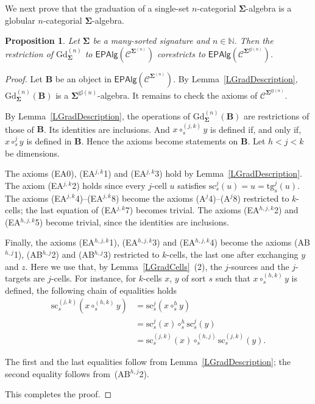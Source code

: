 \documentclass[a4paper, reqno
]{amsart}
\newcommand{\sig}[1]{\mathbf{#1}}             %
\newcommand{\spec}[1]{\boldsymbol{\mathcal{#1}}} %
\newcommand{\gl}{\mathrm{gl}}                %
\newcommand{\src}{\mathrm{sc}}
\newcommand{\tgt}{\mathrm{tg}}
\newcommand{\Gd}{\mathrm{Gd}}
\theoremstyle{plain}
\newtheorem{proposition}[theorem]{Proposition}
\theoremstyle{definition}
\begin{document}
We next prove that the graduation of a single-set $n$-categorial $\sig{\Sigma}$-algebra is a globular $n$-categorial $\sig{\Sigma}$-algebra.

\begin{proposition}\label{PGradDerivor}
Let $\sig{\Sigma}$ be a many-sorted signature and $n\in\mathbb{N}$.
Then the restriction of $\Gd^{(n)}_{\sig{\Sigma}}$ to $\mathsf{EPAlg}(\spec{C}^{\sig{\Sigma}^{(n)}})$ corestricts to $\mathsf{EPAlg}(\spec{C}^{\sig{\Sigma}^{\gl(n)}})$.
\end{proposition}
\begin{proof}
Let $\mathbf{B}$ be an object in $\mathsf{EPAlg}(\spec{C}^{\sig{\Sigma}^{(n)}})$.
By Lemma~\ref{LGradDescription}, $\Gd^{(n)}_{\sig{\Sigma}}(\mathbf{B})$ is a $\sig{\Sigma}^{\gl(n)}$-algebra.
It remains to check the axioms of $\spec{C}^{\sig{\Sigma}^{\gl(n)}}$.

By Lemma~\ref{LGradDescription}, the operations of $\Gd^{(n)}_{\sig{\Sigma}}(\mathbf{B})$ are restrictions of those of $\mathbf{B}$.
Its identities are inclusions.
And $x\circ^{(j,k)}_{s}y$ is defined if, and only if, $x\circ^{j}_{s}y$ is defined in $\mathbf{B}$.
Hence the axioms become statements on $\mathbf{B}$.
Let $h<j<k$ be dimensions.

The axioms (EA0), (EA$^{j,k}$1) and (EA$^{j,k}$3) hold by Lemma~\ref{LGradDescription}.
The axiom (EA$^{j,k}$2) holds since every $j$-cell $u$ satisfies $\src^{j}_{s}(u)=u=\tgt^{j}_{s}(u)$.
The axioms (EA$^{j,k}$4)--(EA$^{j,k}$8) become the axioms (A$^{j}$4)--(A$^{j}$8) restricted to $k$-cells; the last equation of (EA$^{j,k}$7) becomes trivial.
The axioms (EA$^{h,j,k}$2) and (EA$^{h,j,k}$5) become trivial, since the identities are inclusions.

Finally, the axioms (EA$^{h,j,k}$1), (EA$^{h,j,k}$3) and (EA$^{h,j,k}$4) become the axioms (AB$^{h,j}$1), (AB$^{h,j}$2) and (AB$^{h,j}$3) restricted to $k$-cells, the last one after exchanging $y$ and $z$.
Here we use that, by Lemma~\ref{LGradCells}~(2), the $j$-sources and the $j$-targets are $j$-cells.
For instance, for $k$-cells $x$, $y$ of sort $s$ such that $x\circ^{(h,k)}_{s}y$ is defined, the following chain of equalities holds
\begin{align*}
\src^{(j,k)}_{s}\left(x\circ^{(h,k)}_{s}y\right)
&=
\src^{j}_{s}\left(x\circ^{h}_{s}y\right)
\tag{1}
\\&=
\src^{j}_{s}(x)\circ^{h}_{s}\src^{j}_{s}(y)
\tag{2}
\\&=
\src^{(j,k)}_{s}(x)\circ^{(h,j)}_{s}\src^{(j,k)}_{s}(y).
\tag{3}
\end{align*}

The first and the last equalities follow from Lemma~\ref{LGradDescription}; the second equality follows from~(AB$^{h,j}$2).

This completes the proof.
\end{proof}
\end{document}
